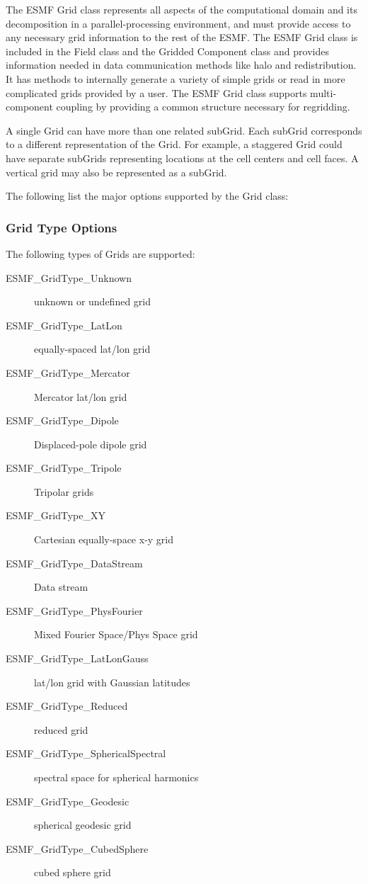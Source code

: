 %


The ESMF Grid class represents all aspects of the computational domain and its
decomposition in a parallel-processing environment, and must provide access to
any necessary grid information to the rest of the ESMF.  The ESMF Grid class
is included in the Field class and the Gridded Component class
and provides information needed in data communication methods like halo and
redistribution.  It has methods to internally generate a variety of
simple grids or read in more complicated grids provided by a user.  The
ESMF Grid class supports multi-component coupling by providing a common
structure necessary for regridding.

A single Grid can have more than one related subGrid.  Each subGrid corresponds
to a different representation of the Grid.  For example, a staggered Grid could
have separate subGrids representing locations at the cell centers and cell 
faces.  A vertical grid may also be represented as a subGrid.

The following list the major options supported by the Grid class:
\subsubsection{Grid Type Options}
The following types of Grids are supported:
\begin{description}
   \item[ESMF\_GridType\_Unknown] unknown or undefined grid
   \item[ESMF\_GridType\_LatLon] equally-spaced lat/lon grid
   \item[ESMF\_GridType\_Mercator] Mercator lat/lon grid
   \item[ESMF\_GridType\_Dipole] Displaced-pole dipole grid
   \item[ESMF\_GridType\_Tripole] Tripolar grids
   \item[ESMF\_GridType\_XY] Cartesian equally-space x-y grid
   \item[ESMF\_GridType\_DataStream] Data stream
   \item[ESMF\_GridType\_PhysFourier] Mixed Fourier Space/Phys Space grid
   \item[ESMF\_GridType\_LatLonGauss] lat/lon grid with Gaussian latitudes
   \item[ESMF\_GridType\_Reduced] reduced grid
   \item[ESMF\_GridType\_SphericalSpectral] spectral space for spherical harmonics
   \item[ESMF\_GridType\_Geodesic] spherical geodesic grid
   \item[ESMF\_GridType\_CubedSphere] cubed sphere grid
\end{description}

